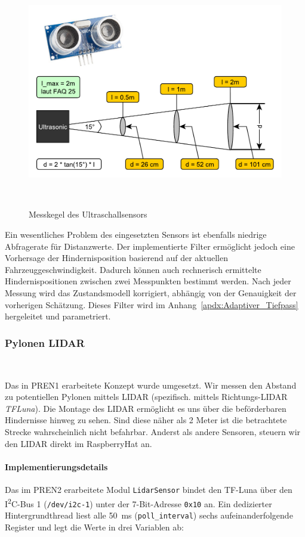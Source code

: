 \documentclass[main.tex]{subfiles} %
\begin{document}
\begin{figure}[H]
  \centering
  \includegraphics[width =
    0.5\linewidth]{./fig_Antriebsregelung_Firmware/Auslesegenauigkeit_Ultraschall.pdf}
  \caption{Messkegel des Ultraschallsensors}~\label{fig:HcSr04_Messkegel}
\end{figure}

Ein wesentliches Problem des eingesetzten Sensors ist ebenfalls niedrige
Abfragerate für Distanzwerte. Der implementierte Filter ermöglicht jedoch eine
Vorhersage der Hindernisposition basierend auf der aktuellen
Fahrzeuggeschwindigkeit. Dadurch können auch rechnerisch ermittelte
Hindernispositionen zwischen zwei Messpunkten bestimmt werden. Nach jeder
Messung wird das Zustandsmodell korrigiert, abhängig von der Genauigkeit der
vorherigen Schätzung. Dieses Filter wird im
Anhang~\ref{apdx:Adaptiver_Tiefpass} hergeleitet und parametriert.


\subsubsection*{Pylonen LIDAR}~\label{sec:Sensorik_Lidar}

Das in PREN1 erarbeitete Konzept wurde umgesetzt. Wir messen den
Abstand zu potentiellen Pylonen
mittels LIDAR (spezifisch. mittels Richtungs-LIDAR \textit{TFLuna}).
Die Montage des LIDAR ermöglicht es uns über die beförderbaren
Hindernisse hinweg zu sehen.
Sind diese näher als 2 Meter ist die betrachtete Strecke
wahrscheinlich nicht befahrbar.
Anderst als andere Sensoren, steuern wir den LIDAR direkt im RaspberryHat an.

\paragraph{Implementierungsdetails}
Das im PREN2 erarbeitete Modul \texttt{LidarSensor} bindet den TF-Luna über den
I\textsuperscript{2}C-Bus
1 (\texttt{/dev/i2c-1}) unter der 7-Bit-Adresse \texttt{0x10} an.
Ein dedizierter Hintergrundthread liest alle \SI{50}{ms}
(\texttt{poll\_interval}) sechs aufeinanderfolgende Register und legt
die Werte in drei Variablen ab:
\end{document}

